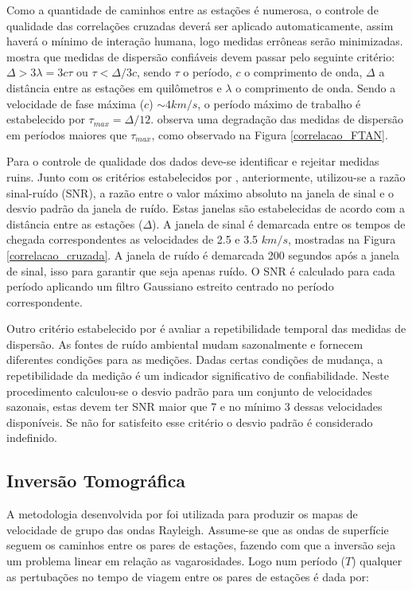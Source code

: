 Como a quantidade de caminhos entre as estações é numerosa, o controle de qualidade das correlações cruzadas deverá ser aplicado automaticamente, assim haverá o mínimo de interação humana, logo medidas errôneas serão minimizadas. \cite{bensen_processing_2007} mostra que medidas de dispersão confiáveis devem passar pelo seguinte critério: $\Delta > 3\lambda = 3c\tau$ ou $\tau < \Delta/3c$, sendo $\tau$ o período, $c$ o comprimento de onda, $\Delta$ a distância entre as estações em quilômetros e $\lambda$ o comprimento de onda. Sendo a velocidade de fase máxima ($c$) $\sim 4 km/s$, o período máximo de trabalho é estabelecido por $\tau_{max} = \Delta/12$. \cite{bensen_processing_2007} observa uma degradação das medidas de dispersão em períodos maiores que $\tau_{max}$, como observado na Figura \ref{correlacao_FTAN}. 

Para o controle de qualidade dos dados deve-se identificar e rejeitar medidas ruins. Junto com os critérios estabelecidos por \cite{bensen_processing_2007}, anteriormente, utilizou-se a razão sinal-ruído (SNR), a razão entre o valor máximo absoluto na janela de sinal e o desvio padrão da janela de ruído. Estas janelas são estabelecidas de acordo com a distância entre as estações ($\Delta$). A janela de sinal é demarcada entre os tempos de chegada correspondentes as velocidades de 2.5 e 3.5 $km/s$, mostradas na Figura \ref{correlacao_cruzada}. A janela de ruído é demarcada 200 segundos após a janela de sinal, isso para garantir que seja apenas ruído. O SNR é calculado para cada período aplicando um filtro Gaussiano estreito centrado no período correspondente.

Outro critério estabelecido por \cite{bensen_processing_2007} é avaliar a repetibilidade temporal das medidas de dispersão. As fontes de ruído ambiental mudam sazonalmente e fornecem diferentes condições para as medições. Dadas certas condições de mudança, a repetibilidade da medição é um indicador significativo de confiabilidade. Neste procedimento calculou-se o desvio padrão para um conjunto de velocidades sazonais, estas devem ter SNR maior que 7 e no mínimo 3 dessas velocidades disponíveis. Se não for satisfeito esse critério o desvio padrão é considerado indefinido.

\subsection{Inversão Tomográfica}

A metodologia desenvolvida por  \cite{barmin_fast_2001} foi utilizada para produzir os mapas de velocidade de grupo das ondas Rayleigh. Assume-se que as ondas de superfície seguem os caminhos entre os pares de estações, fazendo com que a inversão seja um problema linear em relação as vagarosidades. Logo num período ($T$) qualquer as pertubações no tempo de viagem entre os pares de estações é dada por:

